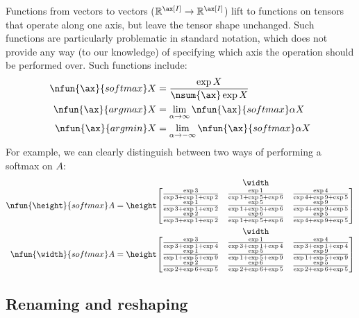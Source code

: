 Functions from vectors to vectors ($\reals^{\ax[I]} \rightarrow \reals^{\ax[I]}$) lift to functions on tensors that operate along one axis, but leave the tensor shape unchanged. Such functions are particularly problematic in standard notation, which does not provide any way (to our knowledge) of specifying which axis the operation should be performed over. Such functions include:
\begin{subequations}
\begin{align}
  \nfun{\ax}{softmax} X &= \frac{\exp X}{\nsum{\ax} \exp X} \label{eq:def_softmax} \\
  \nfun{\ax}{argmax} X &= \lim_{\alpha \rightarrow \infty} \nfun{\ax}{softmax} \alpha X \\
  \nfun{\ax}{argmin} X &= \lim_{\alpha \rightarrow -\infty} \nfun{\ax}{softmax} \alpha X
\end{align}
\end{subequations}
For example, we can clearly distinguish between two ways of performing a softmax on $A$:
\begin{align*}
  \nfun{\height}{softmax} A &= \nmatrix{\height}{\width}{ 
    \frac{\exp 3}{\exp 3 + \exp 1 + \exp 2} & \frac{\exp 1}{\exp 1 + \exp 5 + \exp 6} & \frac{\exp 4}{\exp 4 + \exp 9 + \exp 5} \\
    \frac{\exp 1}{\exp 3 + \exp 1 + \exp 2} & \frac{\exp 5}{\exp 1 + \exp 5 + \exp 6} & \frac{\exp 9}{\exp 4 + \exp 9 + \exp 5} \\
    \frac{\exp 2}{\exp 3 + \exp 1 + \exp 2} & \frac{\exp 6}{\exp 1 + \exp 5 + \exp 6} & \frac{\exp 5}{\exp 4 + \exp 9 + \exp 5} \\
    }
  \\
  \nfun{\width}{softmax} A &= \nmatrix{\height}{\width}{
    \frac{\exp 3}{\exp 3 + \exp 1 + \exp 4} & \frac{\exp 1}{\exp 3 + \exp 1 + \exp 4} & \frac{\exp 4}{\exp 3 + \exp 1 + \exp 4} \\
    \frac{\exp 1}{\exp 1 + \exp 5 + \exp 9} & \frac{\exp 5}{\exp 1 + \exp 5 + \exp 9} & \frac{\exp 9}{\exp 1 + \exp 5 + \exp 9} \\
    \frac{\exp 2}{\exp 2 + \exp 6 + \exp 5} & \frac{\exp 6}{\exp 2 + \exp 6 + \exp 5} & \frac{\exp 5}{\exp 2 + \exp 6 + \exp 5} \\
    }
\end{align*}

\subsection{Renaming and reshaping}

